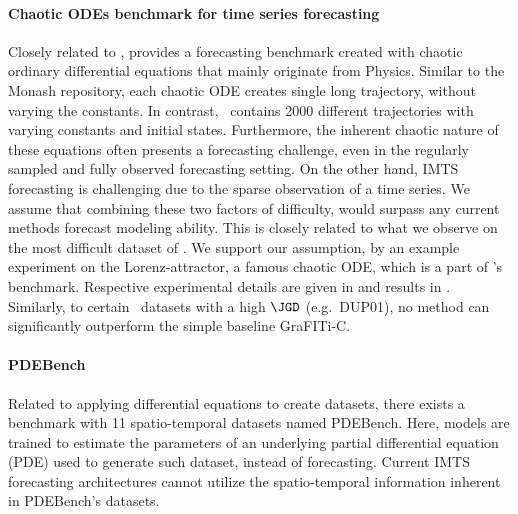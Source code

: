\paragraph{Chaotic ODEs benchmark for time series forecasting}
Closely related to \Bench, \citet{Gilpin2021.Chaosa} provides a forecasting benchmark
created with chaotic ordinary differential equations that mainly originate from Physics.
Similar to the Monash repository, each chaotic ODE creates single long trajectory, without
varying the constants. In contrast, \Bench~contains 2000 different trajectories with varying
constants and initial states.
Furthermore, the inherent chaotic nature of these equations often presents a forecasting
challenge, even in the regularly sampled and fully observed forecasting setting.
On the other hand, IMTS forecasting is challenging due to the sparse observation of a time series.
We assume that combining these two factors of difficulty, would surpass any current methods
forecast modeling ability. This is closely related to what we observe on the most difficult
dataset of \Bench. We support our assumption, by an example experiment
on the Lorenz-attractor, a famous chaotic ODE, which is a part of \citet{Gilpin2021.Chaosa}'s
benchmark. Respective experimental details are given in  and results
in . Similarly, to certain \Bench~datasets with a high $\JGD$
(e.g.\ DUP01), no method can significantly outperform the simple baseline GraFITi-C.

\paragraph{PDEBench~\citep{Takamoto2022.Pdebencha}}
Related to applying differential equations to create datasets, there exists a benchmark with 11 spatio-temporal datasets named PDEBench.
Here, models are trained to estimate the parameters of an underlying partial differential equation (PDE) used to generate such dataset, instead of forecasting.
Current IMTS forecasting architectures cannot utilize the spatio-temporal information inherent in PDEBench's datasets.
